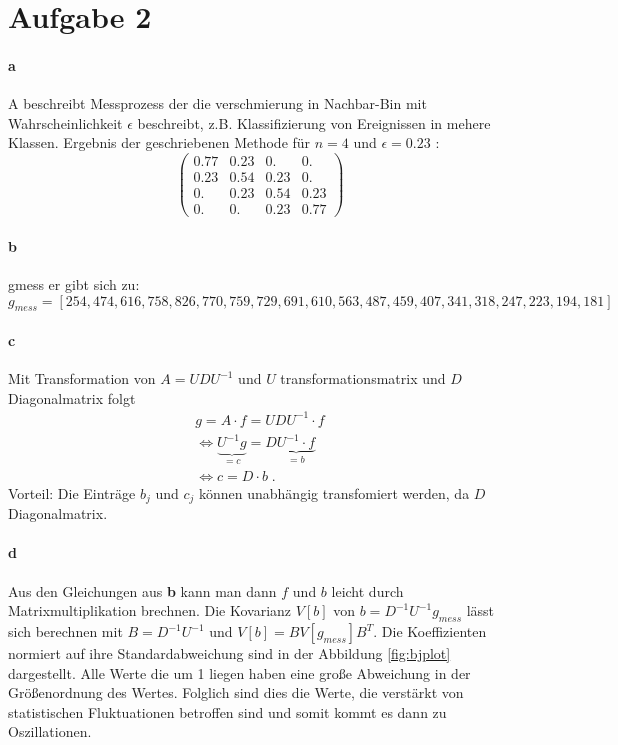 \FloatBarrier
\section{Aufgabe 2}
\label{sec:Aufgabe2}
%
\paragraph{a} 
A beschreibt Messprozess der die verschmierung in Nachbar-Bin mit Wahrscheinlichkeit $\epsilon$ beschreibt, 
z.B. Klassifizierung von Ereignissen in mehere Klassen. 
Ergebnis der geschriebenen Methode für $n= 4$ und $ \epsilon = 0.23$ :
\begin{equation}
\begin{pmatrix}
0.77& 0.23& 0.  & 0.  \\
0.23& 0.54& 0.23& 0.  \\
0.  & 0.23& 0.54& 0.23\\
0.  & 0.  & 0.23& 0.77
\end{pmatrix}
\label{eq:ma}
\end{equation}

\paragraph{b}
gmess er gibt sich zu: 
\begin{equation}
g_{mess} = [254,474,616,758,826,770,759,729,691,610,563,487,459,407,341,318,247,223,194,181]
\end{equation}
\paragraph{c}
Mit Transformation von $A = UDU^{-1}$ und $U$ transformationsmatrix und $D$ Diagonalmatrix folgt
\begin{gather}
g = A\cdot f = UDU^{-1} \cdot f \\
\iff \underbrace{U^{-1} g}_{=c} = D \underbrace{U^{-1} \cdot f}_{=b} \\
\iff c = D\cdot b  \; .
\label{eq:cdb}
\end{gather}
Vorteil: Die Einträge $b_j$ und $c_j$ können unabhängig transfomiert werden, da $D$ Diagonalmatrix. 

\paragraph{d}
Aus den Gleichungen aus \textbf{b} kann man dann $f$ und $b$ leicht durch Matrixmultiplikation 
brechnen. Die Kovarianz $V[b]$ von $b = D^{-1} U^{-1} g_{mess}$ lässt sich berechnen mit 
$B = D^{-1} U^{-1} $ und $V[b] = BV[g_{mess}]B^T$. Die Koeffizienten normiert auf ihre Standardabweichung 
sind in der Abbildung \ref{fig:bjplot} dargestellt. Alle Werte die um 1 liegen haben eine große Abweichung 
in der Größenordnung des Wertes. 
Folglich sind dies die Werte, 
die verstärkt von statistischen Fluktuationen betroffen sind und somit kommt es dann zu Oszillationen.
 
